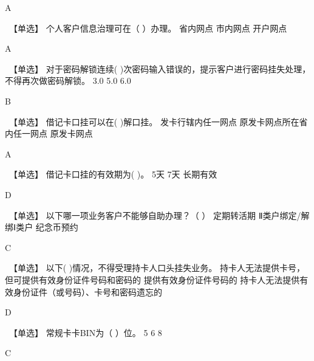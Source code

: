 \documentclass[kindlepaper]{BHCexam4kindle}
\begin{document}
\begin{questions}
\begin{solution} A \end{solution}
\qs　【单选】 个人客户信息治理可在（  ）办理。 \xx
{} {  省内网点 } { 市内网点 } { 开户网点 }
\begin{solution} A \end{solution}
\qs　【单选】 对于密码解锁连续(    )次密码输入错误的，提示客户进行密码挂失处理，不得再次做密码解锁。 \xx
{} {  3.0 } { 5.0 } { 6.0 }
\begin{solution} B \end{solution}
\qs　【单选】 借记卡口挂可以在(    )解口挂。 \xx
{} {  发卡行辖内任一网点 } { 原发卡网点所在省内任一网点 } { 原发卡网点 }
\begin{solution} A \end{solution}
\qs　【单选】 借记卡口挂的有效期为(    )。 \xx
{} {  5天 } { 7天 } { 长期有效 }
\begin{solution} D \end{solution}
\qs　【单选】 以下哪一项业务客户不能够自助办理？（  ） \xx
{} {  定期转活期 } { Ⅱ类户绑定/解绑Ⅰ类户 } { 纪念币预约 }
\begin{solution} C \end{solution}
\qs　【单选】 以下(    )情况，不得受理持卡人口头挂失业务。 \xx
{} {  持卡人无法提供卡号，但可提供有效身份证件号码和密码的 } { 提供有效身份证件号码的 } { 持卡人无法提供有效身份证件（或号码）、卡号和密码遗忘的 }
\begin{solution} D \end{solution}
\qs　【单选】 常规卡卡BIN为（ ）位。 \xx
{} {  5 } { 6 } { 8 }
\begin{solution} C \end{solution}

\end{questions}
\end{document}
